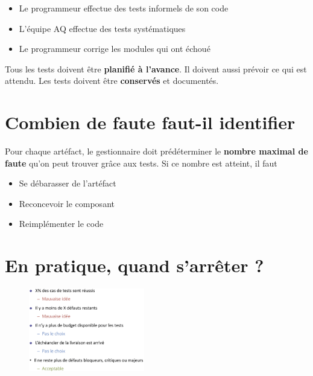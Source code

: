 \documentclass[16pt]{report}
\begin{document}
\begin{multicols*}{2}
       \begin{itemize}
        \item Le programmeur effectue des tests informels de son code
        \item L’équipe AQ effectue des tests systématiques
        \item Le programmeur corrige les modules qui ont échoué
       \end{itemize}

       \begin{note}{}{}
           Tous les tests doivent être \textbf{planifié à l'avance}. Il doivent aussi prévoir ce qui 
           est attendu. Les tests doivent être \textbf{conservés} et documentés.   
       \end{note}


       \section{Combien de faute faut-il identifier}

       Pour chaque artéfact, le gestionnaire doit prédéterminer le \textbf{nombre maximal de faute} 
       qu'on peut trouver grâce aux tests. Si ce nombre est atteint, il faut 
       \begin{itemize}
        \item Se débarasser de l'artéfact
        \item Reconcevoir le composant 
        \item Reimplémenter le code
       \end{itemize}
       

       \section{En pratique, quand s'arrêter ?}

       \begin{figure}[H]
        \begin{center}
            \includegraphics[width=0.45\textwidth]{ArreterTests.png}
        \end{center}
       \end{figure}



\end{multicols*}
\end{document}
